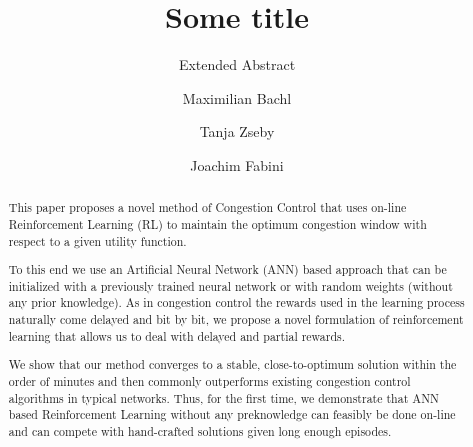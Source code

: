 \documentclass[sigconf]{acmart}
\begin{document}
\title{Some title}
\subtitle{Extended Abstract}

\author{Maximilian Bachl} 

\author{Tanja Zseby} 

\author{Joachim Fabini} 

\renewcommand{\shortauthors}{Bachl, Zseby, Fabini}

\begin{abstract}
This paper proposes a novel method of Congestion Control that uses on-line Reinforcement Learning (RL) to maintain the optimum congestion window with respect to a given utility function. 

To this end we use an Artificial Neural Network (ANN) based approach that can be initialized with a previously trained neural network or with random weights (without any prior knowledge). As in congestion control the rewards used in the learning process naturally come delayed and bit by bit, we propose a novel formulation of reinforcement learning that allows us to deal with delayed and partial rewards.

We show that our method converges to a stable, close-to-optimum solution within the order of minutes and then commonly outperforms existing congestion control algorithms in typical networks. Thus, for the first time, we demonstrate that ANN based Reinforcement Learning without any preknowledge can feasibly be done on-line and can compete with hand-crafted solutions given long enough episodes. 

\end{abstract}
\end{document}
